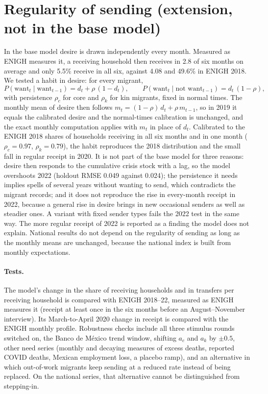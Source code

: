 \section{Regularity of sending (extension, not in the base model)}

In the base model desire is drawn independently every month. Measured as ENIGH measures it, a receiving household then receives in 2.8 of six months on average and only 5.5\% receive in all six, against 4.08 and 49.6\% in ENIGH 2018. We tested a habit in desire: for every migrant,
\begin{equation}
P(\text{want}_t \mid \text{want}_{t-1}) = d_t + \rho\,(1 - d_t), \qquad P(\text{want}_t \mid \text{not want}_{t-1}) = d_t\,(1 - \rho),
\end{equation}
with persistence $\rho_c$ for core and $\rho_k$ for kin migrants, fixed in normal times. The monthly mean of desire then follows $m_t = (1 - \rho)\,d_t + \rho\,m_{t-1}$, so in 2019 it equals the calibrated desire and the normal-times calibration is unchanged, and the exact monthly computation applies with $m_t$ in place of $d_t$. Calibrated to the ENIGH 2018 shares of households receiving in all six months and in one month ($\rho_c = 0.97$, $\rho_k = 0.79$), the habit reproduces the 2018 distribution and the small fall in regular receipt in 2020. It is not part of the base model for three reasons: desire then responds to the cumulative crisis stock with a lag, so the model overshoots 2022 (holdout RMSE 0.049 against 0.024); the persistence it needs implies spells of several years without wanting to send, which contradicts the migrant records; and it does not reproduce the rise in every-month receipt in 2022, because a general rise in desire brings in new occasional senders as well as steadier ones. A variant with fixed sender types fails the 2022 test in the same way. The more regular receipt of 2022 is reported as a finding the model does not explain. National results do not depend on the regularity of sending as long as the monthly means are unchanged, because the national index is built from monthly expectations.

\paragraph{Tests.} The model's change in the share of receiving households and in transfers per receiving household is compared with ENIGH 2018--22, measured as ENIGH measures it (receipt at least once in the six months before an August--November interview). Its March-to-April 2020 change in receipt is compared with the ENIGH monthly profile. Robustness checks include all three stimulus rounds switched on, the Banco de M\'exico trend window, shifting $a_c$ and $a_k$ by $\pm 0.5$, other need series (monthly and decaying measures of excess deaths, reported COVID deaths, Mexican employment loss, a placebo ramp), and an alternative in which out-of-work migrants keep sending at a reduced rate instead of being replaced. On the national series, that alternative cannot be distinguished from stepping-in.

